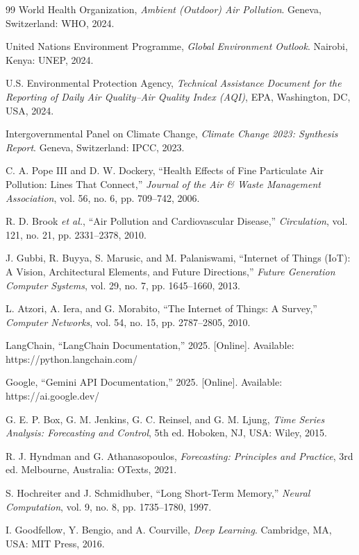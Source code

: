 \documentclass[conference]{IEEEtran}
\begin{document}
\begin{thebibliography}{99}
World Health Organization, \emph{Ambient (Outdoor) Air Pollution}. Geneva, Switzerland: WHO, 2024.

United Nations Environment Programme, \emph{Global Environment Outlook}. Nairobi, Kenya: UNEP, 2024.

U.S. Environmental Protection Agency, \emph{Technical Assistance Document for the Reporting of Daily Air Quality--Air Quality Index (AQI)}, EPA, Washington, DC, USA, 2024.

Intergovernmental Panel on Climate Change, \emph{Climate Change 2023: Synthesis Report}. Geneva, Switzerland: IPCC, 2023.

C. A. Pope III and D. W. Dockery, ``Health Effects of Fine Particulate Air Pollution: Lines That Connect,'' \emph{Journal of the Air \& Waste Management Association}, vol. 56, no. 6, pp. 709--742, 2006.

R. D. Brook \emph{et al.}, ``Air Pollution and Cardiovascular Disease,'' \emph{Circulation}, vol. 121, no. 21, pp. 2331--2378, 2010.

J. Gubbi, R. Buyya, S. Marusic, and M. Palaniswami, ``Internet of Things (IoT): A Vision, Architectural Elements, and Future Directions,'' \emph{Future Generation Computer Systems}, vol. 29, no. 7, pp. 1645--1660, 2013.

L. Atzori, A. Iera, and G. Morabito, ``The Internet of Things: A Survey,'' \emph{Computer Networks}, vol. 54, no. 15, pp. 2787--2805, 2010.

LangChain, ``LangChain Documentation,'' 2025. [Online]. Available: https://python.langchain.com/

Google, ``Gemini API Documentation,'' 2025. [Online]. Available: https://ai.google.dev/

G. E. P. Box, G. M. Jenkins, G. C. Reinsel, and G. M. Ljung, \emph{Time Series Analysis: Forecasting and Control}, 5th ed. Hoboken, NJ, USA: Wiley, 2015.

R. J. Hyndman and G. Athanasopoulos, \emph{Forecasting: Principles and Practice}, 3rd ed. Melbourne, Australia: OTexts, 2021.

S. Hochreiter and J. Schmidhuber, ``Long Short-Term Memory,'' \emph{Neural Computation}, vol. 9, no. 8, pp. 1735--1780, 1997.

I. Goodfellow, Y. Bengio, and A. Courville, \emph{Deep Learning}. Cambridge, MA, USA: MIT Press, 2016.


\end{thebibliography}
\end{document}
